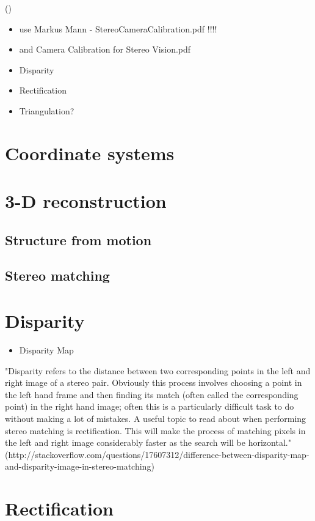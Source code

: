 (\cite{Hartley.2011})
\begin{itemize}
\item use Markus Mann - StereoCameraCalibration.pdf !!!!
\item and Camera Calibration for Stereo Vision.pdf
\item Disparity
\item Rectification
\item Triangulation?
\end{itemize}

\section{Coordinate systems}

\section{3-D reconstruction}

\subsection{Structure from motion}\label{ssec:SfM}
\subsection{Stereo matching}\label{ssec:stereoMatch}

\section{Disparity}

\begin{itemize}
\item Disparity Map
\end{itemize}

"Disparity refers to the distance between two corresponding points in the left and right image of a stereo pair. Obviously this process involves choosing a point in the left hand frame and then finding its match (often called the corresponding point) in the right hand image; often this is a particularly difficult task to do without making a lot of mistakes. A useful topic to read about when performing stereo matching is rectification. This will make the process of matching pixels in the left and right image considerably faster as the search will be horizontal."
(http://stackoverflow.com/questions/17607312/difference-between-disparity-map-and-disparity-image-in-stereo-matching)

\section{Rectification}
